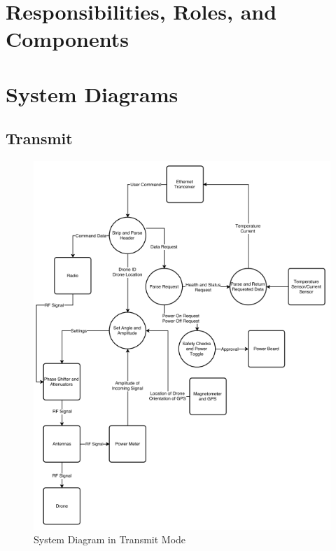 \documentclass[11pt]{article}
\numberwithin{figure}{section}
\begin{document}

\vfill

\pagebreak

\tableofcontents
\pagebreak

\section{Responsibilities, Roles, and Components}

\pagebreak

\pagebreak


\section{System Diagrams}
\subsection{Transmit}
	\begin{figure}[H]
		\centering
		\includegraphics[scale=1]{../SystemDiagram/Transmit.png}
		\caption{System Diagram in Transmit Mode \label{fig:System Diagram in Transmit Mode}}
	\end{figure}
\end{document}

